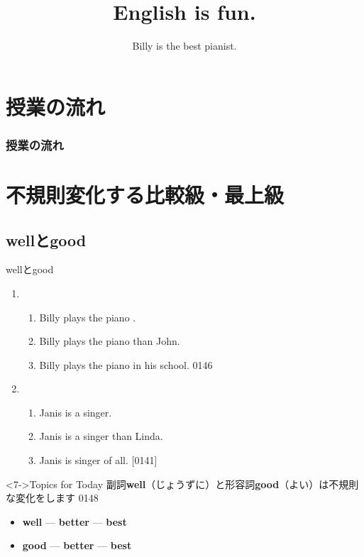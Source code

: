 \documentclass[aspectratio=169,xcolor={dvipsnames,table}]{beamer}
\title{English is fun.}
\subtitle{Billy is the best pianist.}
\author{}
\institute[]{}
\date[]
\begin{document}
\begin{frame}[plain]
  \titlepage
\end{frame}

\section*{授業の流れ}
\begin{frame}[plain]
  \frametitle{授業の流れ}
  \tableofcontents
\end{frame}
\section{不規則変化する比較級・最上級}
\subsection{wellとgood}
\begin{frame}[plain]{wellとgood}
 \begin{enumerate}
  \item \begin{enumerate}
	 \item<1-> Billy plays the piano .
	 \item<2-> Billy plays the piano  than John.
	 \item<3-> Billy plays the piano  in his school.%
\hfill{\tiny 0146}\,{\scriptsize {}}
	\end{enumerate}
  \item \begin{enumerate}
	 \item<4-> Janis is a  singer.
	 \item<5-> Janis is a  singer than Linda.
	 \item<6-> Janis is  singer of all.
\hfill[\tiny 0141]\,{\scriptsize {}}
	\end{enumerate}
 \end{enumerate}

\begin{block}<7->{Topics for Today}\small
副詞{\bfseries well}（じょうずに）と形容詞{\bfseries good}（よい）は不規則な変化をします%
\hfill{\tiny 0148}\,{\scriptsize {}}

\begin{itemize}[square]\small
 \item {\bfseries well}  --- {\bfseries better}  --- {\bfseries best} 
 \item {\bfseries good}  --- {\bfseries better} --- {\bfseries best} 
 \end{itemize}
     \end{block}
\end{frame}
\end{document}
